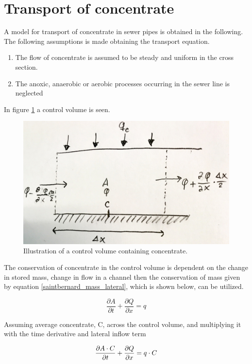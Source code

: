 \section{Transport of concentrate}\label{se:transport_of_concentrate}

A model for transport of concentrate in sewer pipes is obtained in the following.
The following assumptions is made obtaining the transport equation.

 \begin{table}[H]
\begin{enumerate}
	\item The flow of concentrate is assumed to be steady and uniform in the cross section.
	\item The anoxic, anaerobic or aerobic processes occurring in the sewer line is neglected   
\end{enumerate}
\label{tab:concentrate_flow}
\end{table}
 
In figure \ref{fig:poopvolume} a control volume is seen.
\begin{figure}[H]
\centering
\includegraphics[width=.6\textwidth]{report/modeling/pictures/poopvolume2.png}
\caption{Illustration of a control volume containing concentrate.}
\label{fig:poopvolume}
\end{figure} 

The conservation of concentrate in the control volume is dependent on the change in stored mass, change in flow in a channel then the conservation of mass given by equation \ref{saintbernard_mass_lateral}, which is shown below, can be utilized.

\begin{equation}	
\frac{\partial A}{\partial t} + \frac{\partial Q}{\partial x}=q
\end{equation}

Assuming average concentrate, C, across the control volume, and multiplying it with the time derivative and lateral inflow term

\begin{equation}
	\frac{\partial A \cdot C}{\partial t} + \frac{\partial Q}{\partial x}=q \cdot C \\
\end{equation}

